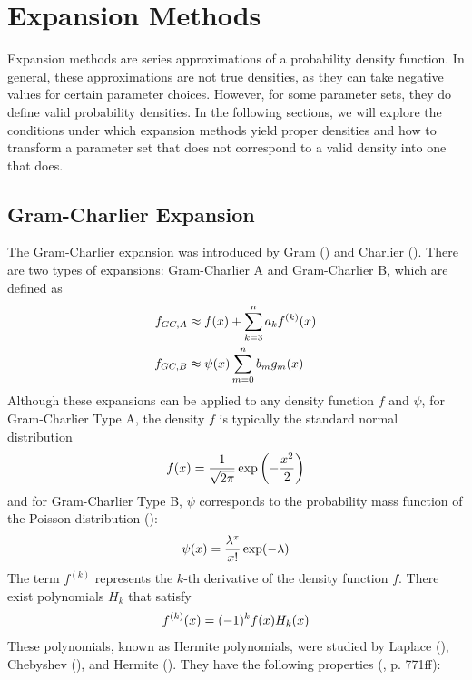 \chapter{Expansion Methods}
\label{sec:expansion_methods}

Expansion methods are series approximations of a probability density function. In general, these approximations are not true densities, as they can take negative values for certain parameter choices. However, for some parameter sets, they do define valid probability densities. In the following sections, we will explore the conditions under which expansion methods yield proper densities and how to transform a parameter set that does not correspond to a valid density into one that does.

\section{Gram-Charlier Expansion}
The Gram-Charlier expansion was introduced by Gram (\citeyear{gramUeberEntwickelungReeller1883}) and Charlier (\citeyear{charlierContributionsMathematicalTheory1914}). There are two types of expansions: Gram-Charlier A and Gram-Charlier B, which are defined as
\begin{align}
    f_{GC,A} &\approx f(x) + \sum_{k=3}^n a_k f^{(k)}(x) \notag \\
    f_{GC,B} &\approx \psi(x)\sum_{m=0}^n b_mg_m(x) \notag
\end{align}
Although these expansions can be applied to any density function $f$ and $\psi$, for Gram-Charlier Type A, the density $f$ is typically the standard normal distribution
\begin{align}
    f(x) = \frac{1}{\sqrt{2\pi}}\exp\left(-\frac{x^2}{2}\right) \notag
\end{align}
and for Gram-Charlier Type B, $\psi$ corresponds to the probability mass function of the Poisson distribution (\cite{mitropolskiiGramCharlierSeries2020}):
\begin{align}
    \psi(x) = \frac{\lambda^x}{x!}\exp(-\lambda) \notag
\end{align}
The term $f^{(k)}$ represents the $k$-th derivative of the density function $f$. There exist polynomials $H_k$ that satisfy
\begin{align}
    f^{(k)}(x) = (-1)^k f(x)H_k(x) \notag
\end{align}
These polynomials, known as Hermite polynomials, were studied by Laplace (\citeyear{laplaceMemoireIntegralesDefinies1811,laplaceTheorieAnalytiqueProbabilites1812}), Chebyshev (\citeyear{chebyshevDeveloppementFonctionsSeule1860}), and Hermite (\citeyear{hermiteNouveauDeveloppementSerie1864}). They have the following properties (\cite{abramowitzHandbookMathematicalFunctions1968}, p. 771ff):
